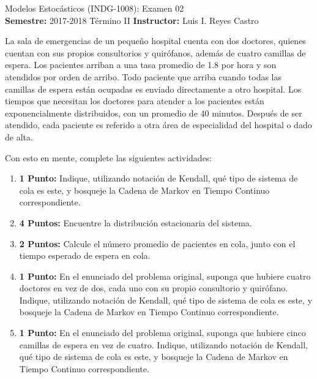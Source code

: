 \documentclass[ a4paper, twoside, 11pt]{article}
\newcommand{\numero}{02}
\begin{document}
\allowdisplaybreaks



\begin{center}
\Large Modelos Estoc\'asticos (INDG-1008): Examen \numero \\[2ex]
\small \textbf{Semestre:} 2017-2018 T\'ermino II \qquad
\textbf{Instructor:} Luis I. Reyes Castro
\end{center}
\fullskip

\begin{problem}
La sala de emergencias de un peque\~no hospital cuenta con dos doctores, quienes cuentan con sus propios consultorios y quir\'ofanos, adem\'as de cuatro camillas de espera. \linebreak Los pacientes arriban a una tasa promedio de 1.8 por hora y son atendidos por orden de arribo. \linebreak Todo paciente que arriba cuando todas las camillas de espera est\'an ocupadas es enviado directamente a otro hospital. Los tiempos que necesitan los doctores para atender a los pacientes est\'an exponencialmente distribuidos, con un promedio de 40 minutos. Despu\'es de ser atendido, cada paciente es referido a otra \'area de especialidad del hospital o dado de alta. 

Con esto en mente, complete las siguientes actividades: 
\begin{enumerate}[label=\textbf{\alph*)}]
\item \textbf{1 Punto:} Indique, utilizando notaci\'on de Kendall, qu\'e tipo de sistema de cola es este, y bosqueje la Cadena de Markov en Tiempo Continuo correspondiente. 
\item \textbf{4 Puntos:} Encuentre la distribuci\'on estacionaria del sistema. 
\item \textbf{2 Puntos:} Calcule el n\'umero promedio de pacientes en cola, junto con el tiempo esperado de espera en cola. 
\item \textbf{1 Punto:} En el enunciado del problema original, suponga que hubiere cuatro doctores en vez de dos, cada uno con su propio consultorio y quir\'ofano. Indique, utilizando notaci\'on de Kendall, qu\'e tipo de sistema de cola es este, y bosqueje la Cadena de Markov en Tiempo Continuo correspondiente. 
\item \textbf{1 Punto:} En el enunciado del problema original, suponga que hubiere cinco camillas de espera en vez de cuatro. Indique, utilizando notaci\'on de Kendall, qu\'e tipo de sistema de cola es este, y bosqueje la Cadena de Markov en Tiempo Continuo correspondiente. 
\end{enumerate}

\end{problem}
\fullskip
\end{document}
